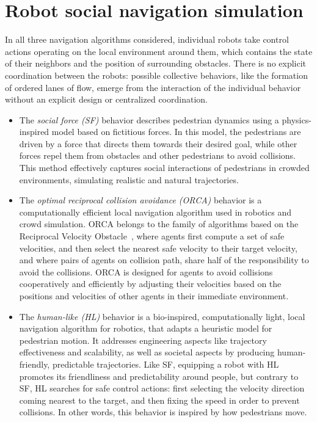 \documentclass{article}
\begin{document}
\section{Robot social navigation simulation}\label{sec:behaviors}


In all three navigation algorithms considered, 
individual robots take control actions operating on the local environment around them, which contains the state of their neighbors and the position of surrounding obstacles. 
There is no explicit coordination between the robots: possible collective behaviors, like the formation of ordered lanes of flow, emerge from the interaction of the individual behavior without an explicit design or centralized coordination.

\begin{itemize}

    \item The {\it social force (SF)} behavior \cite{SocialForceBehavior} describes pedestrian dynamics using a physics-inspired model based on fictitious forces. In this model, the pedestrians are driven by a force that directs them towards their desired goal, while other forces repel them from obstacles and other pedestrians to avoid collisions. This method effectively captures 
    social interactions of pedestrians in crowded environments, simulating realistic and natural trajectories. 

    \item The {\it optimal reciprocal collision avoidance (ORCA)} behavior \cite{ORCAbehavior}  is a computationally efficient local navigation algorithm used in robotics and crowd simulation. ORCA belongs to the family of algorithms based on the Reciprocal Velocity Obstacle~\cite{van2008reciprocal}, where agents first compute a set of safe velocities, and then select the nearest safe velocity to their target velocity, and where pairs of agents on collision path, share half of the responsibility to avoid the collisions.
   ORCA is designed for agents to avoid collisions 
     cooperatively and efficiently by adjusting their velocities based on the positions and velocities of other agents in their immediate environment.

    \item The {\it human-like (HL)} behavior \cite{HLikeJerome} is a bio-inspired, computationally light, local navigation algorithm for robotics, that adapts a heuristic model for pedestrian motion. It addresses engineering aspects like trajectory effectiveness and scalability, as well as societal aspects by producing human-friendly, predictable trajectories. Like SF, equipping 
    a robot with HL promotes its friendliness and predictability around people, but contrary to SF, HL searches for safe control actions: first selecting the velocity direction coming nearest to the target, and then fixing the speed in order to prevent collisions.
    In other words, this behavior is inspired by how pedestrians move.

\end{itemize}
\end{document}
